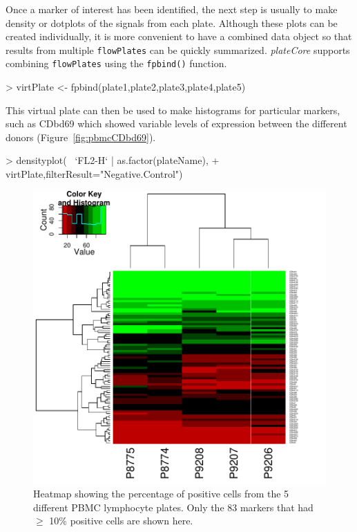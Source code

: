 \documentclass[12pt]{article}
\newcommand{\Rfunction}[1]{{\texttt{#1()}}}
\newcommand{\Robject}[1]{{\texttt{#1}}}
\newcommand{\Rpackage}[1]{{\textit{#1}}}
\begin{document}
Once a marker of interest has been identified, the next step is usually to make density or dotplots of the signals from each
plate. Although these plots can be created individually, it is more convenient to have a combined data object so that results 
from multiple \Robject{flowPlates} can be quickly summarized. \Rpackage{plateCore} supports combining \Robject{flowPlates} using
the \Rfunction{fpbind} function. 
\begin{Schunk}
\begin{Sinput}
> virtPlate <- fpbind(plate1,plate2,plate3,plate4,plate5)
\end{Sinput}
\end{Schunk}
This virtual plate can then be used to make histograms for particular markers, such as CDbd69 which showed variable levels of
expression between the different donors (Figure~\ref{fig:pbmcCDbd69}). 
\begin{Schunk}
\begin{Sinput}
> densityplot(~ `FL2-H` | as.factor(plateName),
+ 	virtPlate,filterResult="Negative.Control")
\end{Sinput}
\end{Schunk}

\begin{figure}
\centering
\includegraphics{outline-pbmcHeat}
\caption{Heatmap showing the percentage of positive cells from the 5 different PBMC lymphocyte plates. Only the 83 markers
that had $\ge$ 10\% positive cells are shown here.}
\label{fig:pbmcHeat}
\end{figure}
\end{document}
